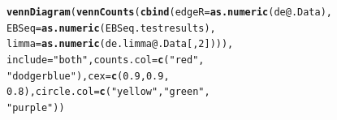 \documentclass[a4paper,10pt]{article}\usepackage[]{graphicx}\usepackage[]{color}
\makeatletter
\newcommand{\hlnum}[1]{\textcolor[rgb]{0.686,0.059,0.569}{#1}}%
\newcommand{\hlstr}[1]{\textcolor[rgb]{0.192,0.494,0.8}{#1}}%
\newcommand{\hlopt}[1]{\textcolor[rgb]{0,0,0}{#1}}%
\newcommand{\hlstd}[1]{\textcolor[rgb]{0.345,0.345,0.345}{#1}}%
\newcommand{\hlkwc}[1]{\textcolor[rgb]{0.333,0.667,0.333}{#1}}%
\newcommand{\hlkwd}[1]{\textcolor[rgb]{0.737,0.353,0.396}{\textbf{#1}}}%
\newenvironment{kframe}{%
 \def\at@end@of@kframe{}%
 \ifinner\ifhmode%
  \def\at@end@of@kframe{\end{minipage}}%
  \begin{minipage}{\columnwidth}%
 \fi\fi%
 \def\FrameCommand##1{\hskip\@totalleftmargin \hskip-\fboxsep
 \colorbox{shadecolor}{##1}\hskip-\fboxsep
     \hskip-\linewidth \hskip-\@totalleftmargin \hskip\columnwidth}%
 \MakeFramed {\advance\hsize-\width
   \@totalleftmargin\z@ \linewidth\hsize
   \@setminipage}}%
 {\par\unskip\endMakeFramed%
 \at@end@of@kframe}
\newenvironment{knitrout}{}{} %
\makeatother
\begin{document}
\begin{knitrout}
\begin{kframe}
\begin{alltt}
\hlkwd{vennDiagram}\hlstd{(}\hlkwd{vennCounts}\hlstd{(}\hlkwd{cbind}\hlstd{(}\hlkwc{edgeR} \hlstd{=} \hlkwd{as.numeric}\hlstd{(de}\hlopt{@}\hlkwc{.Data}\hlstd{),}
    \hlkwc{EBSeq} \hlstd{=} \hlkwd{as.numeric}\hlstd{(EBSeq.testresults),}
    \hlkwc{limma} \hlstd{=} \hlkwd{as.numeric}\hlstd{(de.limma}\hlopt{@}\hlkwc{.Data}\hlstd{[,} \hlnum{2}\hlstd{]))),}
    \hlkwc{include} \hlstd{=} \hlstr{"both"}\hlstd{,} \hlkwc{counts.col} \hlstd{=} \hlkwd{c}\hlstd{(}\hlstr{"red"}\hlstd{,}
        \hlstr{"dodgerblue"}\hlstd{),} \hlkwc{cex} \hlstd{=} \hlkwd{c}\hlstd{(}\hlnum{0.9}\hlstd{,} \hlnum{0.9}\hlstd{,}
        \hlnum{0.8}\hlstd{),} \hlkwc{circle.col} \hlstd{=} \hlkwd{c}\hlstd{(}\hlstr{"yellow"}\hlstd{,} \hlstr{"green"}\hlstd{,}
        \hlstr{"purple"}\hlstd{))}
\end{alltt}
\end{kframe}
\end{knitrout}
\end{document}
